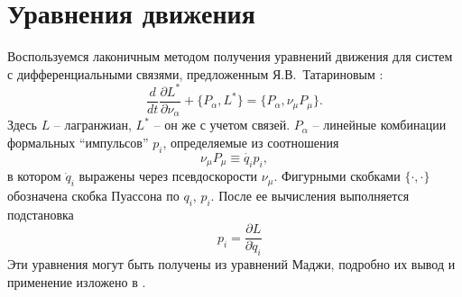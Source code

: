 \section{Уравнения движения}

Воспользуемся лаконичным методом получения уравнений движения для систем с дифференциальными связями, предложенным Я.В.~Татариновым \cite{Tatarinov}:
\begin{equation}\label{Tatarinov}
    \frac{d}{dt}\frac{\partial L^{*}}{\partial \nu_\alpha}  + \{P_\alpha, L^{*}\} = \{P_\alpha, \nu_\mu P_\mu\}.
\end{equation}
Здесь $L$ -- лагранжиан, $L^*$ -- он же с учетом связей. $P_\alpha$ -- линейные комбинации формальных ``импульсов'' $p_i$, определяемые из соотношения 
$$\nu_\mu P_\mu \equiv \dot{q_i} p_i,$$
 в котором $\dot{q}_i$ выражены через псевдоскорости $\nu_\mu$. Фигурными скобками $\{\cdot, \cdot\}$ обозначена скобка Пуассона по $q_i$, $p_i$. После ее вычисления выполняется подстановка 
$$\hspace{10pt} p_i = \frac{\partial L}{\partial \dot{q}_i}$$
Эти уравнения могут быть получены из уравнений Маджи, подробно их вывод и применение изложено в \cite{Tatarinov,Zobova2011,Zobova_ND}.

